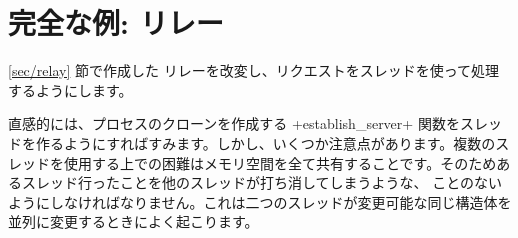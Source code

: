 \section{\label{ex/th-relais}完全な例: {\normalfont\http} リレー}

\ref{sec/relay} 節で作成した \http リレーを改変し、リクエストをスレッドを使って処理するようにします。

直感的には、プロセスのクローンを作成する \ml+establish_server+ 関数をスレッドを作るようにすればすみます。しかし、いくつか注意点があります。複数のスレッドを使用する上での困難はメモリ空間を全て共有することです。そのためあるスレッド行ったことを他のスレッドが打ち消してしまうような、 ことのないようにしなければなりません。これは二つのスレッドが変更可能な同じ構造体を並列に変更するときによく起こります。

